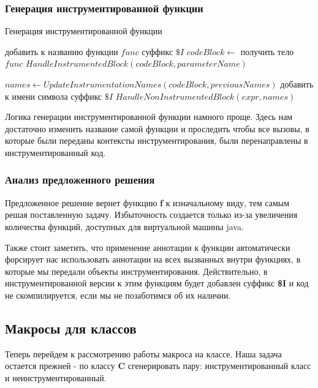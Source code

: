 \subsubsection{Генерация инструментированной функции}

\begin{algorithm}
\caption{Генерация инструментированной функции}\label{alg:ins}
\begin{algorithmic}[1]
  \State добавить к названию функции $func$ суффикс $\$I$
  \State $codeBlock \gets$ получить тело $func$
  \State $HandleInstrumentedBlock(codeBlock, parameterName)$
\EndFunction

  \State $names \gets UpdateInstrumentationNames(codeBlock, previousNames)$
      \State добавить к имени символа суффикс $\$I$
      \State $HandleNonInstrumentedBlock(expr, names)$
    \EndIf
  \EndFor
\EndFunction
\end{algorithmic}
\end{algorithm}


Логика генерации инструментированной функции намного проще.
Здесь нам достаточно изменить название самой функции и проследить чтобы все
вызовы, в которые были переданы контексты инструментирования, были
перенаправлены в инструментированный код.

\subsubsection{Анализ предложенного решения}

Предложенное решение вернет функцию \textbf{f} к изначальному виду, тем самым
решая поставленную задачу.
Избыточность создается только из-за увеличения количества функций,
доступных для виртуальной машины java.

Также стоит заметить, что применение аннотации к функции автоматически форсирует
нас использовать аннотации на всех вызванных внутри функциях, в которые мы передали
объекты инструментирования.
Действительно, в инструментированной версии к этим функциям будет добавлен
суффикс \textbf{\$I} и код не скомпилируется, если мы не позаботимся об их наличии.

\subsection{Макросы для классов}
\label{sec:macroClass}
Теперь перейдем к рассмотрению работы макроса на классе.
Наша задача остается прежней - по классу \textbf{C} сгенерировать пару:
инструментированный класс и неинструментированный.

